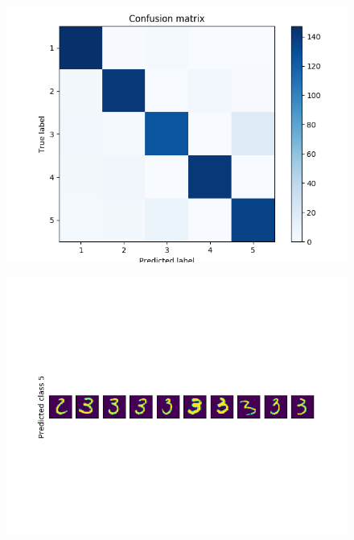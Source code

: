 \documentclass[a4paper]{article}
\begin{document}
\begin{enumerate}[label=(\alph*)]
\begin{figure}[htp]
\centering
\begin{minipage}{0.4\textwidth}
  \includegraphics[scale=0.5]{plots/ex3b_1.png}
  \label{fig:16}
\end{minipage}
\hfill
\begin{minipage}{0.4\textwidth}
  \includegraphics[scale=0.5]{plots/ex3b_2.png}
  \label{fig:17}
\end{minipage}
\end{figure}

\end{enumerate}
\end{document}
